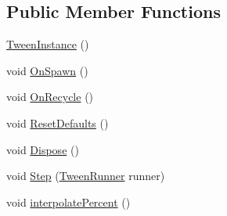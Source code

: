 \subsection*{Public Member Functions}
\begin{DoxyCompactItemize}
\item 
\mbox{\hyperlink{class_leap_1_1_unity_1_1_animation_1_1_internal_1_1_tween_instance_acf076931e04e4962bcb09f339c28103f}{Tween\+Instance}} ()
\item 
void \mbox{\hyperlink{class_leap_1_1_unity_1_1_animation_1_1_internal_1_1_tween_instance_a39c988e26296542f98568605d17263f2}{On\+Spawn}} ()
\item 
void \mbox{\hyperlink{class_leap_1_1_unity_1_1_animation_1_1_internal_1_1_tween_instance_acbda036d82d4e18d0957b5f2a5506103}{On\+Recycle}} ()
\item 
void \mbox{\hyperlink{class_leap_1_1_unity_1_1_animation_1_1_internal_1_1_tween_instance_a26f8945be59207c1cc17d309386e1081}{Reset\+Defaults}} ()
\item 
void \mbox{\hyperlink{class_leap_1_1_unity_1_1_animation_1_1_internal_1_1_tween_instance_af40da8409916e69858816eadd58e60e9}{Dispose}} ()
\item 
void \mbox{\hyperlink{class_leap_1_1_unity_1_1_animation_1_1_internal_1_1_tween_instance_a97039709d9678b0307e8af16c7416664}{Step}} (\mbox{\hyperlink{class_leap_1_1_unity_1_1_animation_1_1_internal_1_1_tween_runner}{Tween\+Runner}} runner)
\item 
void \mbox{\hyperlink{class_leap_1_1_unity_1_1_animation_1_1_internal_1_1_tween_instance_aad4af48f52f0563777dcd13c47c2c28c}{interpolate\+Percent}} ()
\end{DoxyCompactItemize}
